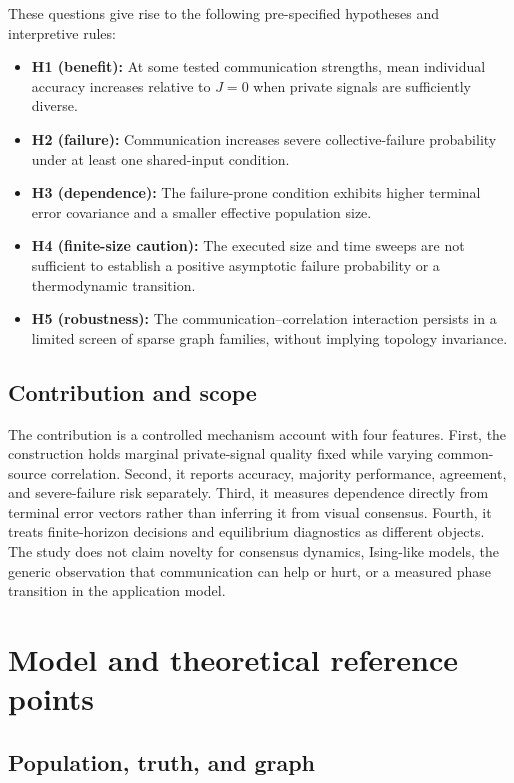 \documentclass[11pt,a4paper]{article}
\begin{document}
These questions give rise to the following pre-specified hypotheses and interpretive rules:

\begin{itemize}
  \item \textbf{H1 (benefit):} At some tested communication strengths, mean individual accuracy increases relative to $J=0$ when private signals are sufficiently diverse.
  \item \textbf{H2 (failure):} Communication increases severe collective-failure probability under at least one shared-input condition.
  \item \textbf{H3 (dependence):} The failure-prone condition exhibits higher terminal error covariance and a smaller effective population size.
  \item \textbf{H4 (finite-size caution):} The executed size and time sweeps are not sufficient to establish a positive asymptotic failure probability or a thermodynamic transition.
  \item \textbf{H5 (robustness):} The communication--correlation interaction persists in a limited screen of sparse graph families, without implying topology invariance.
\end{itemize}

\subsection{Contribution and scope}

The contribution is a controlled mechanism account with four features. First, the construction holds marginal private-signal quality fixed while varying common-source correlation. Second, it reports accuracy, majority performance, agreement, and severe-failure risk separately. Third, it measures dependence directly from terminal error vectors rather than inferring it from visual consensus. Fourth, it treats finite-horizon decisions and equilibrium diagnostics as different objects. The study does not claim novelty for consensus dynamics, Ising-like models, the generic observation that communication can help or hurt, or a measured phase transition in the application model.

\section{Model and theoretical reference points}

\subsection{Population, truth, and graph}
\end{document}
